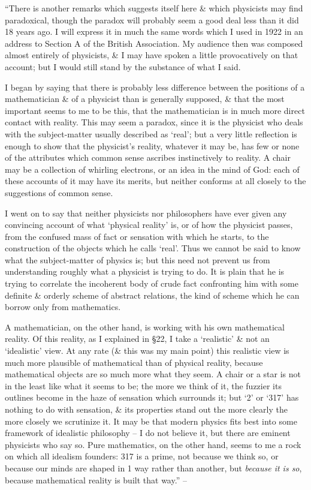 \documentclass{article}
\numberwithin{equation}{section}
\begin{document}
 ``There is another remarks which suggests itself here \& which physicists may find paradoxical, though the paradox will probably seem a good deal less than it did 18 years ago. I will express it in much the same words which I used in 1922 in an address to Section A of the British Association. My audience then was composed almost entirely of physicists, \& I may have spoken a little provocatively on that account; but I would still stand by the substance of what I said.

I began by saying that there is probably less difference between the positions of a mathematician \& of a physicist than is generally supposed, \& that the most important seems to me to be this, that the mathematician is in much more direct contact with reality. This may seem a paradox, since it is the physicist who deals with the subject-matter usually described as `real'; but a very little reflection is enough to show that the physicist's reality, whatever it may be, has few or none of the attributes which common sense ascribes instinctively to reality. A chair may be a collection of whirling electrons, or an idea in the mind of God: each of these accounts of it may have its merits, but neither conforms at all closely to the suggestions of common sense.

I went on to say that neither physicists nor philosophers have ever given any convincing account of what `physical reality' is, or of how the physicist passes, from the confused mass of fact or sensation with which he starts, to the construction of the objects which he calls `real'. Thus we cannot be said to know what the subject-matter of physics is; but this need not prevent us from understanding roughly what a physicist is trying to do. It is plain that he is trying to correlate the incoherent body of crude fact confronting him with some definite \& orderly scheme of abstract relations, the kind of scheme which he can borrow only from mathematics.

A mathematician, on the other hand, is working with his own mathematical reality. Of this reality, as I explained in \S22, I take a `realistic' \& not an `idealistic' view. At any rate (\& this was my main point) this realistic view is much more plausible of mathematical than of physical reality, because mathematical objects are so much more what they seem. A chair or a star is not in the least like what it seems to be; the more we think of it, the fuzzier its outlines become in the haze of sensation which surrounds it; but `2' or `317' has nothing to do with sensation, \& its properties stand out the more clearly the more closely we scrutinize it. It may be that modern physics fits best into some framework of idealistic philosophy -- I do not believe it, but there are eminent physicists who say so. Pure mathematics, on the other hand, seems to me a rock on which all idealism founders: 317 is a prime, not because we think so, or because our minds are shaped in 1 way rather than another, but \textit{because it is so}, because mathematical reality is built that way.'' -- \cite[pp. 128--130]{Hardy1992}
\end{document}
